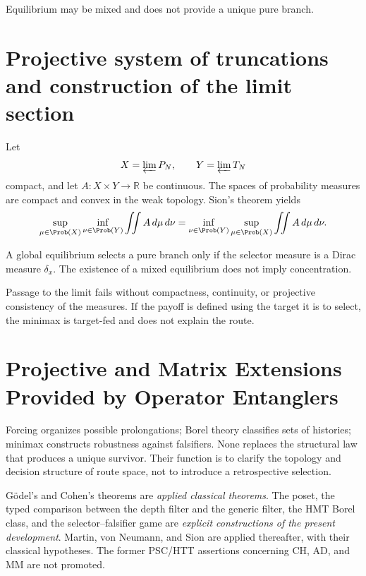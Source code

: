 Equilibrium may be mixed and does not provide a unique pure branch.

\section{Projective system of truncations and construction of the limit section}

Let
\[
 X=\varprojlim P_N,
 \qquad
 Y=\varprojlim T_N
\]
compact, and let \(A:X\times Y\to\mathbb R\) be continuous. The spaces of
probability measures are compact and convex in the weak topology. Sion's
theorem \citep{sion1958} yields
\[
 \sup_{\mu\in\Prob(X)}\inf_{\nu\in\Prob(Y)}
 \iint A\,d\mu\,d\nu
 =
 \inf_{\nu\in\Prob(Y)}\sup_{\mu\in\Prob(X)}
 \iint A\,d\mu\,d\nu.
\]

\begin{corollary}
A global equilibrium selects a pure branch only if the selector measure
is a Dirac measure \(\delta_x\). The existence of a mixed equilibrium does not imply
concentration.
\end{corollary}

\begin{remark}
Passage to the limit fails without compactness, continuity, or projective
consistency of the measures. If the payoff is defined using the target it is
to select, the minimax is target-fed and does not explain the route.
\end{remark}

\section{Projective and Matrix Extensions Provided by Operator Entanglers}

Forcing organizes possible prolongations; Borel theory classifies sets of
histories; minimax constructs robustness against falsifiers. None replaces
the structural law that produces a unique survivor. Their function is to
clarify the topology and decision structure of route space, not to introduce a
retrospective selection.

\begin{remark}
Gödel's and Cohen's theorems are \emph{applied classical theorems}. The
poset, the typed comparison between the depth filter and the generic filter,
the HMT Borel class, and the selector--falsifier game are
\emph{explicit constructions of the present development}. Martin, von Neumann, and Sion are applied
thereafter, with their classical hypotheses. The former PSC/HTT assertions concerning
CH, AD, and MM are not promoted.
\end{remark}

